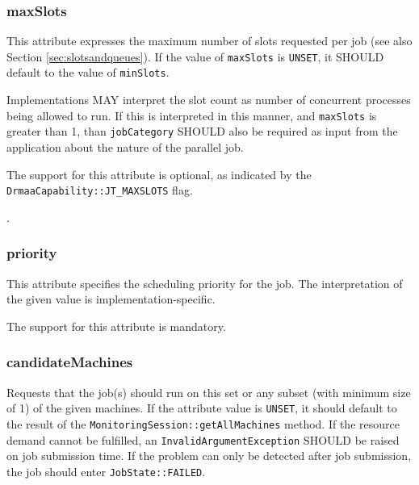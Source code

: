 \documentclass{article}
\newcommand{\h}[1]{\lstinline|#1|}
\newcommand{\rat}[1]{}
\begin{document}
\rat{The hint regarding number of concurrent processes intentionally does not speak about processes per host - this would create semantics for our opaque slot concept.}

\subsubsection{maxSlots}

This attribute expresses the maximum number of slots requested per job (see also Section \ref{sec:slotsandqueues}). If the value of \h{maxSlots} is \h{UNSET}, it SHOULD default to the value of \h{minSlots}.

Implementations MAY interpret the slot count as number of concurrent processes being allowed to run. If this is interpreted in this manner, and \h{maxSlots} is greater than 1, than \h{jobCategory} SHOULD also be required as input from the application about the nature of the parallel job.

The support for this attribute is optional, as indicated by the \h{DrmaaCapability::JT_MAXSLOTS} flag.

\rat{Torque does not support maxSlots on job submission, conf call on May 11th decided to keep it as optional feature. Expected use cases are billing limitations and parallel job scalability considerations}.

\subsubsection{priority}

This attribute specifies the scheduling priority for the job. The interpretation of the given value is implementation-specific.

The support for this attribute is mandatory.

\subsubsection{candidateMachines}

Requests that the job(s) should run on this set or any subset (with minimum size of 1) of the given machines. If the attribute value is \h{UNSET}, it should default to the result of the \h{MonitoringSession::getAllMachines} method. If the resource demand cannot be fulfilled, an \h{InvalidArgumentException} SHOULD be raised on job submission time. If the problem can only be detected after job submission, the job should enter \h{JobState::FAILED}. 
\end{document}
